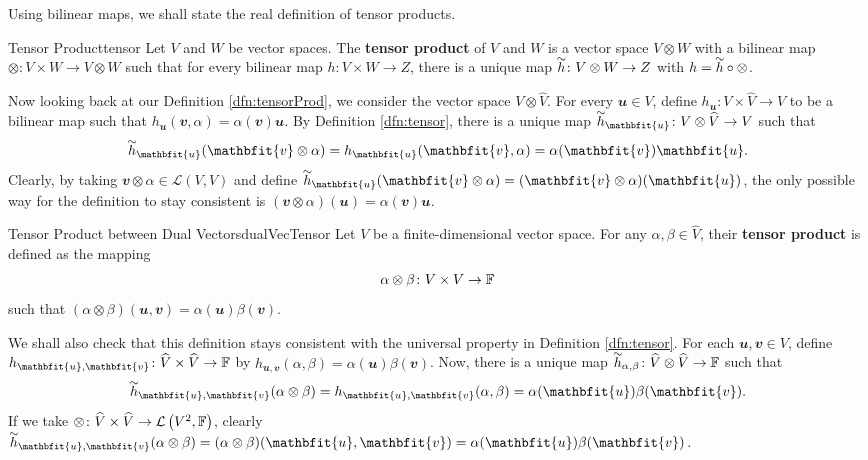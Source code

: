 \documentclass[math, code]{amznotes}
\renewcommand\widetilde[1]{\ThisStyle{%
  \setbox0=\hbox{$\SavedStyle#1$}%
  \stackengine{1pt-\LMpt}{$\SavedStyle#1$}{%
    \stretchto{\scaleto{\SavedStyle\mkern.2mu\sim}{.5467\wd0}}{.5\ht0}%
  }{O}{c}{F}{T}{S}%
}}
\theoremstyle{remark}
\begin{document}
Using bilinear maps, we shall state the real definition of tensor products.
\begin{dfnbox}{Tensor Product}{tensor}
    Let $V$ and $W$ be vector spaces. The {\color{red} \textbf{tensor product}} of $V$ and $W$ is a vector space $V \otimes W$ with a bilinear map $\otimes \colon V \times W \to V \otimes W$ such that for every bilinear map $h \colon V \times W \to Z$, there is a unique map $\widetilde{h} \colon V \otimes W \to Z$ with $h = \widetilde{h} \circ \otimes$.
\end{dfnbox}
Now looking back at our Definition \ref{dfn:tensorProd}, we consider the vector space $V \otimes \widehat{V}$. For every $\mathbfit{u} \in V$, define $h_{\mathbfit{u}} \colon V \times \widehat{V} \to V$ to be a bilinear map such that $h_{\mathbfit{u}}(\mathbfit{v}, \alpha) = \alpha(\mathbfit{v})\mathbfit{u}$. By Definition \ref{dfn:tensor}, there is a unique map $\widetilde{h}_{\mathbfit{u}} \colon V \otimes \widehat{V} \to V$ such that 
\begin{equation*}
    \widetilde{h}_{\mathbfit{u}}(\mathbfit{v} \otimes \alpha) = h_{\mathbfit{u}}(\mathbfit{v}, \alpha) = \alpha(\mathbfit{v})\mathbfit{u}.
\end{equation*}
Clearly, by taking $\mathbfit{v} \otimes \alpha \in \mathcal{L}(V, V)$ and define $\widetilde{h}_{\mathbfit{u}}(\mathbfit{v} \otimes \alpha) = (\mathbfit{v} \otimes \alpha)(\mathbfit{u})$, the only possible way for the definition to stay consistent is $(\mathbfit{v} \otimes \alpha)(\mathbfit{u}) = \alpha(\mathbfit{v})\mathbfit{u}$.
\begin{dfnbox}{Tensor Product between Dual Vectors}{dualVecTensor}
    Let $V$ be a finite-dimensional vector space. For any $\alpha, \beta \in \widehat{V}$, their {\color{red} \textbf{tensor product}} is defined as the mapping 
    \begin{equation*}
        \alpha \otimes \beta \colon V \times V \to \mathbb{F}
    \end{equation*}
    such that $(\alpha \otimes \beta)(\mathbfit{u}, \mathbfit{v}) = \alpha(\mathbfit{u})\beta(\mathbfit{v})$.
\end{dfnbox}
We shall also check that this definition stays consistent with the universal property in Definition \ref{dfn:tensor}. For each $\mathbfit{u}, \mathbfit{v} \in V$, define $h_{\mathbfit{u}, \mathbfit{v}} \colon \widehat{V} \times \widehat{V} \to \F$ by $h_{\mathbfit{u}, \mathbfit{v}}(\alpha, \beta) = \alpha(\mathbfit{u})\beta(\mathbfit{v})$. Now, there is a unique map $\widetilde{h}_{\alpha, \beta} \colon \widehat{V} \otimes \widehat{V} \to \F$ such that 
\begin{equation*}
    \widetilde{h}_{\mathbfit{u}, \mathbfit{v}}(\alpha \otimes \beta) = h_{\mathbfit{u}, \mathbfit{v}}(\alpha, \beta) = \alpha(\mathbfit{u})\beta(\mathbfit{v}).
\end{equation*}
If we take $\otimes \colon \widehat{V} \times \widehat{V} \to \mathcal{L}\left(V^2, \mathbb{F}\right)$, clearly $\widetilde{h}_{\mathbfit{u}, \mathbfit{v}}(\alpha \otimes \beta) = (\alpha \otimes \beta)(\mathbfit{u}, \mathbfit{v}) = \alpha(\mathbfit{u})\beta(\mathbfit{v})$.
\end{document}

